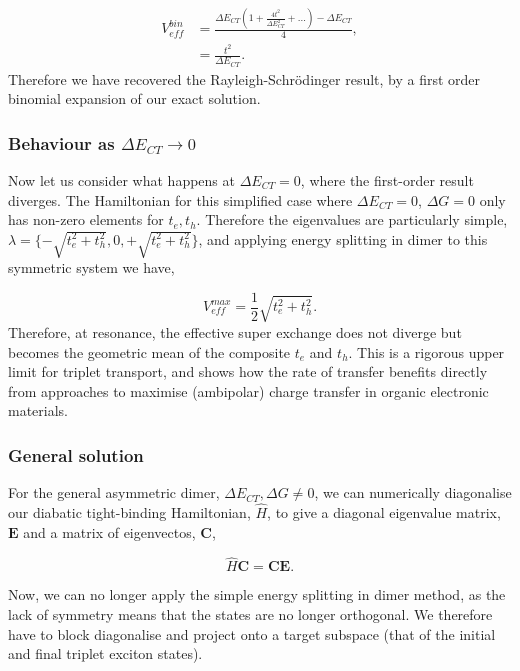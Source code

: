 \documentclass[aps,physrev,reprint,superscriptaddress,nofootinbib,amsmath,amssymb,a4paper]{revtex4-2}
\begin{document}
\begin{equation}
\begin{aligned}
    V_{eff}^{bin} & = \frac{ \Delta E_{CT} (1 + \frac{4t^2}{\Delta E_{CT}^2} + ...) - \Delta E_{CT} }{4} , \\
                  & = \frac{t^2}{\Delta E_{CT}} .
\end{aligned}
\end{equation}
%
Therefore we have recovered the Rayleigh-Schr\"odinger result, by a first order binomial expansion of our exact solution. 

\subsubsection{Behaviour as $\Delta E_{CT} \to 0$}

Now let us consider what happens at $\Delta E_{CT} = 0$, where the first-order result diverges. 
The Hamiltonian for this simplified case where $\Delta E_{CT} = 0$, $\Delta G = 0$ only has non-zero elements for $t_e, t_h$. 
Therefore the eigenvalues are particularly simple, $\lambda = \{ - \sqrt{t_e^2 + t_h^2} , 0, + \sqrt{t_e^2 + t_h^2} \}$, and applying energy splitting in dimer to this symmetric system we have, 

\begin{equation}
    V_{eff}^{max} = \frac{1}{2} \sqrt{t_e^2 + t_h^2} .
\end{equation}
%
Therefore, at resonance, the effective super exchange does not diverge but becomes the geometric mean of the composite $t_e$ and $t_h$. 
This is a rigorous upper limit for triplet transport, and shows how the rate of transfer benefits directly from approaches to maximise (ambipolar) charge transfer in organic electronic materials. 

\subsubsection{General solution}

For the general asymmetric dimer, $\Delta E_{CT}, \Delta G \neq 0 $, we can numerically diagonalise our diabatic tight-binding Hamiltonian, $\hat H$, to give a diagonal eigenvalue matrix, $\bm{E}$ and a matrix of eigenvectos, $\bm{C}$, 

\begin{equation}
    \hat{H} \bm{C} = \bm{C} \bm{E} .
\end{equation}

Now, we can no longer apply the simple energy splitting in dimer method, as the lack of symmetry means that the states are no longer orthogonal. 
We therefore have to block diagonalise and project onto a target subspace (that of the initial and final triplet exciton states). 
\end{document}
